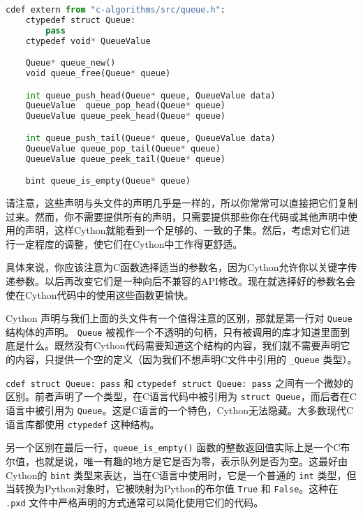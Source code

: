 \begin{translation}
\begin{framed}
\begin{lstlisting}[language=python]
cdef extern from "c-algorithms/src/queue.h":
    ctypedef struct Queue:
        pass
    ctypedef void* QueueValue

    Queue* queue_new()
    void queue_free(Queue* queue)

    int queue_push_head(Queue* queue, QueueValue data)
    QueueValue  queue_pop_head(Queue* queue)
    QueueValue queue_peek_head(Queue* queue)

    int queue_push_tail(Queue* queue, QueueValue data)
    QueueValue queue_pop_tail(Queue* queue)
    QueueValue queue_peek_tail(Queue* queue)

    bint queue_is_empty(Queue* queue)
\end{lstlisting}
\end{framed}

请注意，这些声明与头文件的声明几乎是一样的，所以你常常可以直接把它们复制过来。然而，你不需要提供所有的声明，只需要提供那些你在代码或其他声明中使用的声明，这样Cython就能看到一个足够的、一致的子集。然后，考虑对它们进行一定程度的调整，使它们在Cython中工作得更舒适。

具体来说，你应该注意为C函数选择适当的参数名，因为Cython允许你以关键字传递参数。以后再改变它们是一种向后不兼容的API修改。现在就选择好的参数名会使在Cython代码中的使用这些函数更愉快。

Cython 声明与我们上面的头文件有一个值得注意的区别，那就是第一行对 \lstinline{Queue} 结构体的声明。 \lstinline{Queue} 被视作一个不透明的句柄，只有被调用的库才知道里面到底是什么。既然没有Cython代码需要知道这个结构的内容，我们就不需要声明它的内容，只提供一个空的定义（因为我们不想声明C文件中引用的 \lstinline{_Queue} 类型）。 

\lstinline{cdef struct Queue: pass} 和 \lstinline{ctypedef struct Queue: pass} 之间有一个微妙的区别。前者声明了一个类型，在C语言代码中被引用为 \lstinline{struct Queue}，而后者在C语言中被引用为 \lstinline{Queue}。这是C语言的一个特色，Cython无法隐藏。大多数现代C语言库都使用 \lstinline{ctypedef} 这种结构。

另一个区别在最后一行，\lstinline{queue_is_empty()} 函数的整数返回值实际上是一个C布尔值，也就是说，唯一有趣的地方是它是否为零，表示队列是否为空。这最好由Cython的 \lstinline{bint} 类型来表达，当在C语言中使用时，它是一个普通的 \lstinline{int} 类型，但当转换为Python对象时，它被映射为Python的布尔值 \lstinline{True} 和 \lstinline{False}。这种在 \lstinline{.pxd} 文件中严格声明的方式通常可以简化使用它们的代码。


\end{translation}
